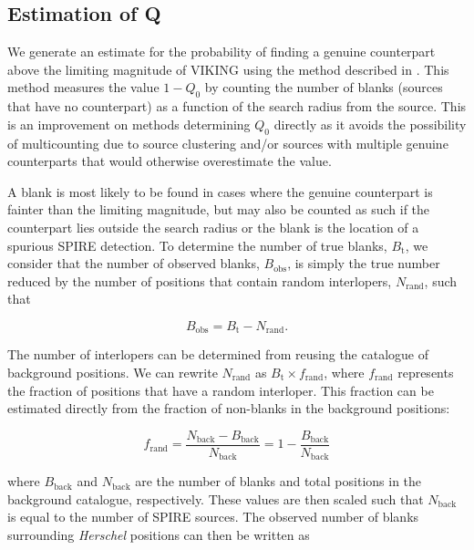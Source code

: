 \documentclass[fleqn,usenatbib]{mnras}
\begin{document}
\subsection{Estimation of Q}
\label{sec:estimation_of_Q}

We generate an estimate for the probability of finding a genuine counterpart above the limiting magnitude of VIKING using the method described in \citealt{Fleuren_2012}. This method measures the value $1 - Q_0$ by counting the number of blanks (sources that have no counterpart) as a function of the search radius from the source. This is an improvement on methods determining $Q_0$ directly as it avoids the possibility of multicounting due to source clustering and/or sources with multiple genuine counterparts that would otherwise overestimate the value. 

A blank is most likely to be found in cases where the genuine counterpart is fainter than the limiting magnitude, but may also be counted as such if the counterpart lies outside the search radius or the blank is the location of a spurious SPIRE detection. To determine the number of true blanks, $B_\textrm{t}$, we consider that the number of observed blanks, $B_\textrm{obs}$, is simply the true number reduced by the number of positions that contain random interlopers, $N_\textrm{rand}$, such that

\begin{equation}
B_\textrm{obs} = B_\textrm{t} - N_\textrm{rand}.
\end{equation}

The number of interlopers can be determined from reusing the catalogue of background positions. We can rewrite $N_\textrm{rand}$ as $B_\textrm{t} \times f_\textrm{rand}$, where $f_\textrm{rand}$ represents the fraction of positions that have a random interloper. This fraction can be estimated directly from the fraction of non-blanks in the background positions:

\begin{equation}
f_\textrm{rand} = \frac{N_\textrm{back} - B_\textrm{back}}{N_\textrm{back}} = 1 - \frac{B_\textrm{back}}{N_\textrm{back}}
\end{equation}

\noindent where $B_\textrm{back}$ and $N_\textrm{back}$ are the number of blanks and total positions in the background catalogue, respectively. These values are then scaled such that $N_\textrm{back}$ is equal to the number of SPIRE sources. The observed number of blanks surrounding \textit{Herschel} positions can then be written as 
\end{document}
